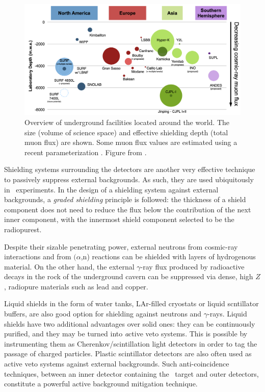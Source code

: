 \begin{figure}[t!b!]
\begin{center}
\includegraphics[width=\textwidth]{img/UndergroundFacilities.png}
\caption{\label{fig:underground_facilities}Overview of underground facilities located around the world. The size (volume of science space) and effective shielding depth (total muon flux) are shown. Some muon flux values are estimated using a recent parameterization \cite{JNE:2020bwn}. Figure from \cite{Baudis:2022pzb,Heise:2022iaf}.}
\end{center}
\end{figure}

Shielding systems surrounding the detectors are another very effective technique to passively suppress external backgrounds. As such, they are used ubiquitously in \bbonu\ experiments. In the design of a shielding system against external backgrounds, a \emph{graded shielding} principle is followed: the thickness of a shield component does not need to reduce the flux below the contribution of the next inner component, with the innermost shield component selected to be the radiopurest.

Despite their sizable penetrating power, external neutrons from cosmic-ray interactions and from $(\alpha$,n) reactions can be shielded with layers of hydrogenous material. On the other hand, the external $\gamma$-ray flux produced by radioactive decays in the rock of the underground cavern can be suppressed via dense, high $Z$, radiopure materials such as lead and copper. 

Liquid shields in the form of water tanks, LAr-filled cryostats or liquid scntillator buffers, are also good option for shielding against neutrons and $\gamma$-rays. Liquid shields have two additional advantages over solid ones: they can be continuously purified, and they may be turned into {\emph active} veto systems. This is possible by instrumenting them as Cherenkov/scintillation light detectors in order to tag the passage of charged particles. Plastic scintillator detectors are also often used as active veto systems against external backgrounds. Such anti-coincidence techniques, between an inner detector containing the \bbonu\ target and outer detectors, constitute a powerful active background mitigation technique. 

